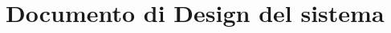 \chapter{Documento di Design del sistema}
\label{cha:Documento di Design del sistema}

\cite{BLABLA}
\lipsum[1-14]